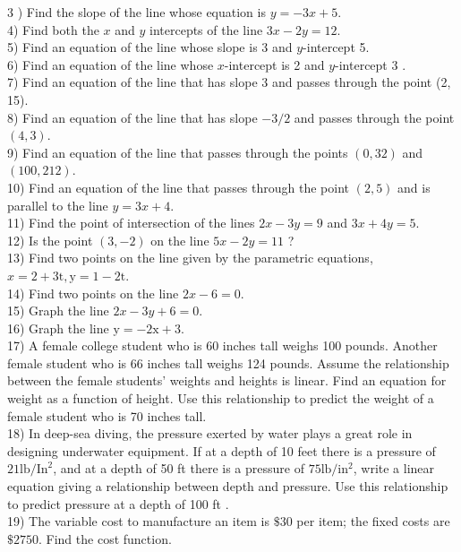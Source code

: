 3 ) Find the slope of the line whose equation is $y=-3 x+5$.\\
4) Find both the $x$ and $y$ intercepts of the line $3 x-2 y=12$.\\
5) Find an equation of the line whose slope is 3 and $y$-intercept 5.\\
6) Find an equation of the line whose $x$-intercept is 2 and $y$-intercept 3 .\\
7) Find an equation of the line that has slope 3 and passes through the point (2, 15).\\
8) Find an equation of the line that has slope $-3 / 2$ and passes through the point $(4,3)$.\\
9) Find an equation of the line that passes through the points $(0,32)$ and $(100,212)$.\\
10) Find an equation of the line that passes through the point $(2,5)$ and is parallel to the line $y=3 x+4$.\\
11) Find the point of intersection of the lines $2 x-3 y=9$ and $3 x+4 y=5$.\\
12) Is the point $(3,-2)$ on the line $5 x-2 y=11$ ?\\
13) Find two points on the line given by the parametric equations, $x=2+3 \mathrm{t}, \mathrm{y}=1-2 \mathrm{t}$.\\
14) Find two points on the line $2 x-6=0$.\\
15) Graph the line $2 x-3 y+6=0$.\\
16) Graph the line $\mathrm{y}=-2 \mathrm{x}+3$.\\
17) A female college student who is 60 inches tall weighs 100 pounds. Another female student who is 66 inches tall weighs 124 pounds. Assume the relationship between the female students' weights and heights is linear. Find an equation for weight as a function of height. Use this relationship to predict the weight of a female student who is 70 inches tall.\\
18) In deep-sea diving, the pressure exerted by water plays a great role in designing underwater equipment. If at a depth of 10 feet there is a pressure of $21 \mathrm{lb} / \mathrm{In}^{2}$, and at a depth of 50 ft there is a pressure of $75 \mathrm{lb} / \mathrm{in}^{2}$, write a linear equation giving a relationship between depth and pressure. Use this relationship to predict pressure at a depth of 100 ft .\\
19) The variable cost to manufacture an item is $\$ 30$ per item; the fixed costs are $\$ 2750$. Find the cost function.\\
